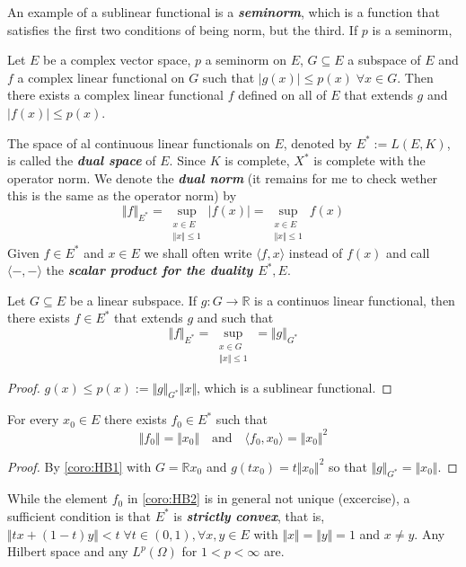 \documentclass{article}
\theoremstyle{definition}
\numberwithin{equation}{section}
\newcommand{\R}{\mathbb{R}}
\begin{document}
An example of a sublinear functional is a \textbf{\textit{seminorm}}, which is a function that satisfies the first two conditions of being norm, but the third. If $p$ is a seminorm, 
\begin{thm}
	Let $E$ be a complex vector space, $p$ a seminorm on $E$, $G\subseteq E$ a subspace of $E$ and $f$ a complex linear functional on $G$ such that $|g(x)|\leq p(x)\;\forall x\in G$. Then there exists a complex linear functional $f$ defined on all of $E$ that extends $g$ and $|f(x)|\leq p(x)$.
\end{thm}

The space of al continuous linear functionals on $E$, denoted by $E^*:=L(E,K)$, is called the \textbf{\textit{dual space}} of $E$. Since $K$ is complete, $X^*$ is complete with the operator norm. We denote the \textbf{\textit{dual norm}} (it remains for me to check wether this is the same as the operator norm) by
\[\Vert f\Vert_{E^*}=\sup_{\substack{x\in E\\\Vert x\Vert\leq1}}|f(x)|=\sup_{\substack{x\in E\\\Vert x\Vert\leq1}}f(x)\]
Given $f\in E^*$ and $x\in E$ we shall often write $\langle f,x\rangle$ instead of $f(x)$ and call $\langle-,-\rangle$ the \textbf{\textit{scalar product for the duality $E^*,E$}}.
\begin{coro}\label{coro:HB1}
	Let $G\subseteq E$ be a linear subspace. If $g:G\to\R$ is a continuos linear functional, then there exists $f\in E^*$ that extends $g$ and such that
	\[\Vert f\Vert_{E^*}=\sup_{\substack{x\in G\\\Vert x\Vert\leq1}}=\Vert g\Vert_{G^*}\]
\end{coro}
\begin{proof}
	$g(x)\leq p(x):=\Vert g\Vert_{G^*}\Vert x\Vert$, which is a sublinear functional.
\end{proof}
\begin{coro}\label{coro:HB2}
	For every $x_0\in E$ there exists $f_0\in E^*$ such that
	\[\Vert f_0\Vert=\Vert x_0\Vert\quad\text{and}\quad\langle f_0,x_0\rangle=\Vert x_0\Vert^2\]
\end{coro}
\begin{proof}
	By \cref{coro:HB1} with $G=\R x_0$ and $g(tx_0)=t\Vert x_0\Vert^2$ so that $\Vert g\Vert_{G^*}=\Vert x_0\Vert$.
\end{proof}
While the element $f_0$ in \cref{coro:HB2} is in general not unique (excercise), a sufficient condition is that $E^*$ is \textbf{\textit{strictly convex}}, that is, $\Vert tx+(1-t)y\Vert<t\;\forall t\in(0,1),\forall x,y\in E$ with $\Vert x\Vert =\Vert y\Vert=1$ and $x\neq y$. Any Hilbert space and any $L^p(\Omega)$ for $1<p<\infty$ are.
\end{document}
